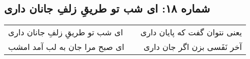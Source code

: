 \begin{center}
\section*{شماره ۱۸: ای شب تو طریقِ زلفِ جانان داری}
\label{sec:018}
\begin{longtable}{l p{0.5cm} r}
ای شب تو طریقِ زلفِ جانان داری
&&
یعنی نتوان گفت که پایان داری
\\
ای صبح مرا جان به لب آمد امشب
&&
آخر نَفَسی بزن اگر جان داری
\\
\end{longtable}
\end{center}
